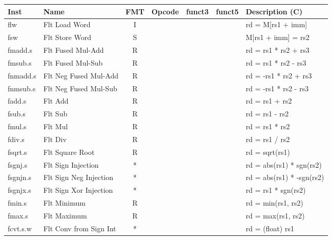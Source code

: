 \begin{center}
\begin{tabular}
{T | l | c | T | T | T | T } \hline
\rm Inst  & Name                  & FMT   & \rm Opcode & \rm funct3 & \rm funct5 & \rm Description (C)         \\ \hline
flw       & Flt Load Word         & I     &            &        &        & rd = M[rs1 + imm]    \\
fsw       & Flt Store Word        & S     &            &        &        & M[rs1 + imm] = rs2   \\
fmadd.s   & Flt Fused Mul-Add     & R     &            &        &        & rd = rs1 * rs2 + rs3 \\
fmsub.s   & Flt Fused Mul-Sub     & R     &            &        &        & rd = rs1 * rs2 - rs3 \\
fnmadd.s  & Flt Neg Fused Mul-Add & R     &            &        &        & rd = -rs1 * rs2 + rs3 \\
fnmsub.s  & Flt Neg Fused Mul-Sub & R     &            &        &        & rd = -rs1 * rs2 - rs3 \\
fadd.s    & Flt Add               & R     &            &        &        & rd = rs1 + rs2       \\
fsub.s    & Flt Sub               & R     &            &        &        & rd = rs1 - rs2       \\
fmul.s    & Flt Mul               & R     &            &        &        & rd = rs1 * rs2       \\
fdiv.s    & Flt Div               & R     &            &        &        & rd = rs1 / rs2       \\
fsqrt.s   & Flt Square Root       & R     &            &        &        & rd = sqrt(rs1)       \\
fsgnj.s   & Flt Sign Injection    & *     &            &        &        & rd = abs(rs1) * sgn(rs2) \\
fsgnjn.s  & Flt Sign Neg Injection& *     &            &        &        & rd = abs(rs1) * -sgn(rs2) \\
fsgnjx.s  & Flt Sign Xor Injection& *     &            &        &        & rd = rs1 * sgn(rs2)  \\
fmin.s    & Flt Minimum           & R     &            &        &        & rd = min(rs1, rs2)   \\
fmax.s    & Flt Maximum           & R     &            &        &        & rd = max(rs1, rs2)   \\
fcvt.s.w  & Flt Conv from Sign Int& *     &            &        &        & rd = (float) rs1 \\

\end{tabular}
\end{center}
